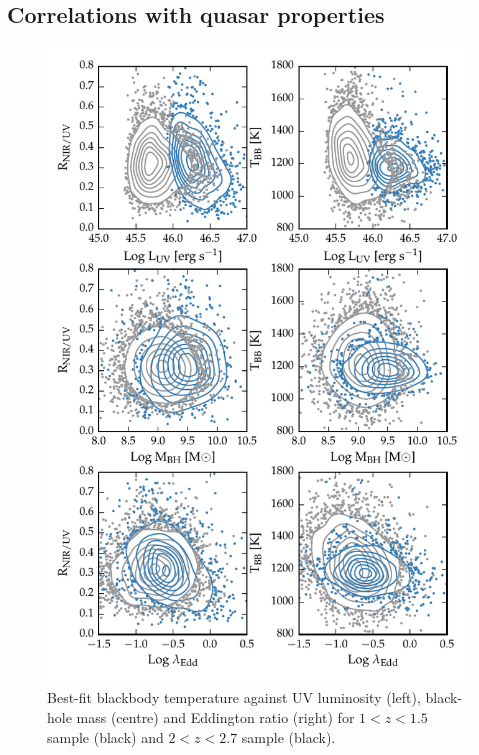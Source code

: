 \subsection{Correlations with quasar properties}

\begin{figure}
  \centering
  \includegraphics[width=\textwidth]{figures/chapter05/correlations_contour.pdf}
  \caption[{Best-fit blackbody temperature against UV luminosity, black-hole mass and Eddington ratio.}]{Best-fit blackbody temperature against UV luminosity (left), black-hole mass (centre) and Eddington ratio (right) for $1 < z < 1.5$ sample (black) and $2 < z < 2.7$ sample (black).  }
  \label{fig:correlations_contour}
\end{figure}

